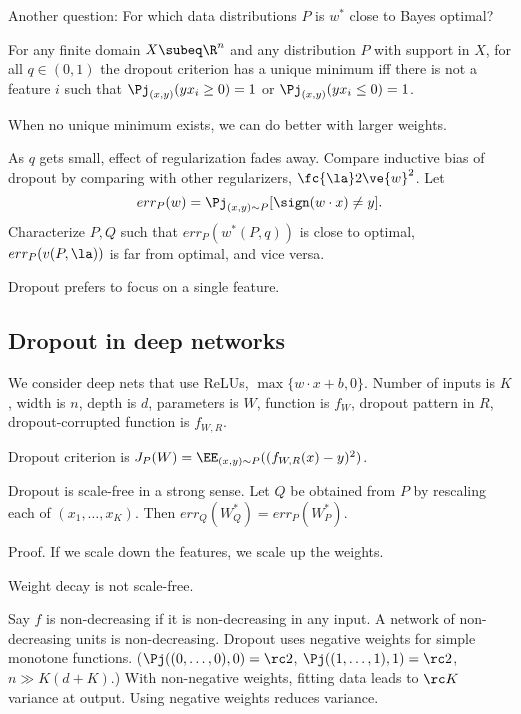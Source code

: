 Another question: For which data distributions $P$ is $w^*$ close to Bayes optimal?

\begin{pr}
For any finite domain $X\subeq \R^n$ and any distribution $P$ with support in $X$, for all $q\in (0,1)$ the dropout criterion has a unique minimum iff there is not a feature $i$ such that $\Pj_{(x,y)} (yx_i\ge 0)=1$ or $\Pj_{(x,y)} (yx_i\le 0)=1$.
\end{pr}
When no unique minimum exists, we can do better with larger weights.

As $q$ gets small, effect of regularization fades away. Compare inductive bias of dropout by comparing with other regularizers, $\fc{\la}2\ve{w}^2$. 
Let
$$
err_P(w) = \Pj_{(x,y)\sim P} [\sign(w\cdot x)\ne y].
$$
Characterize $P,Q$ such that $err_P(w^*(P,q))$ is close to optimal, $err_P(v(P,\la))$ is far from optimal, and vice versa.


Dropout prefers to focus on a single feature.


\subsection{Dropout in deep networks}

We consider deep nets that use ReLUs, $\max\{w\cdot x+b,0\}$. Number of inputs is $K$, width is $n$, depth is $d$, parameters is $W$, function is $f_W$, dropout pattern in $R$, dropout-corrupted function is $f_{W,R}$.

Dropout criterion is $J_P(W) = \EE_{(x,y)\sim P}((f_{W,R}(x)-y)^2)$.

Dropout is scale-free in a strong sense. Let $Q$ be obtained from $P$ by rescaling each of $(x_1,\ldots, x_K)$. Then $err_Q(W_Q^*) = err_P(W_P^*)$.

Proof. If we scale down the features, we scale up the weights.

Weight decay is not scale-free.



Say $f$ is non-decreasing if it is non-decreasing in any input. A network of non-decreasing units is non-decreasing. Dropout uses negative weights for simple monotone functions. ($\Pj((0,\ldots, 0),0)=\rc2$, $\Pj((1,\ldots, 1),1)=\rc 2$, $n\gg K(d+K)$.) With non-negative weights, fitting data leads to $\rc K$ variance at output. Using negative weights reduces variance.

